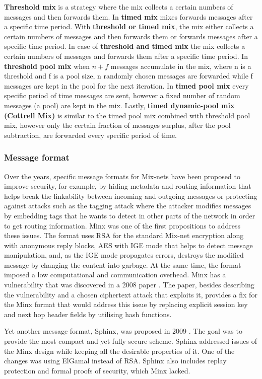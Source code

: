 \textbf{Threshold mix} is a strategy where the mix collects a certain numbers of messages and then forwards them. In \textbf{timed mix} mixes forwards messages after a specific time period. With \textbf{threshold or timed mix}, the mix either collects a certain numbers of messages and then forwards them or forwards messages after a specific time period. In case of \textbf{threshold and timed mix} the mix collects a certain numbers of messages and forwards them after a specific time period. In \textbf{threshold pool mix} when $n+f$ messages accumulate in the mix, where n is a threshold and f is a pool size, n randomly chosen messages are forwarded while f messages are kept in the pool for the next iteration. In \textbf{timed pool mix} every specific period of time messages are sent, however a fixed number of random messages (a pool) are kept in the mix. Lastly,  
\textbf{timed dynamic-pool mix (Cottrell Mix)} is similar to the timed pool mix combined with threshold pool mix, however only the certain fraction of messages surplus, after the pool subtraction, are forwarded every specific period of time.

\subsubsection{Message format}
Over the years, specific message formats for Mix-nets have been proposed to improve security, for example, by hiding metadata and routing information that helps break the linkability between incoming and outgoing messages or protecting against attacks such as the tagging attack where the attacker modifies messages by embedding tags that he wants to detect in other parts of the network in order to get routing information. Minx \cite{minx} was one of the first propositions to address these issues. The format uses RSA for the standard Mix-net encryption along with anonymous reply blocks, AES with IGE mode that helps to detect message manipulation, and, as the IGE mode propagates errors, destroys the modified message by changing the content into garbage. At the same time, the format imposed a low computational and communication overhead. Minx has a vulnerability that was discovered in a 2008 paper \cite{fix-minx}. The paper, besides describing the vulnerability and a chosen ciphertext attack that exploits it, provides a fix for the Minx format that would address this issue by replacing explicit session key and next hop header fields by utilising hash functions.

Yet another message format, Sphinx, was proposed in 2009 \cite{sphinx}. The goal was to provide the most compact and yet fully secure scheme. Sphinx addressed issues of the Minx design while keeping all the desirable properties of it. One of the changes was using ElGamal instead of RSA. Sphinx also includes replay protection and formal proofs of security, which Minx lacked.

